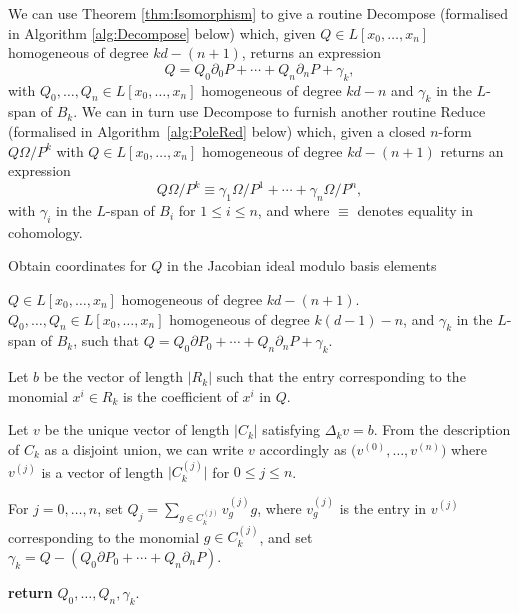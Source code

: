 \documentclass[a4paper,11pt]{article}
\numberwithin{equation}{section}
\providecommand{\abs}[1]{\lvert#1\rvert}                 %
\theoremstyle{definition}
\begin{document}
We can use Theorem \ref{thm:Isomorphism} to give a routine {\sc Decompose} (formalised in
Algorithm \ref{alg:Decompose} below) which, 
given $Q \in L[x_0, \dotsc, x_n]$ homogeneous of degree $kd - (n+1)$, 
returns an expression 
\begin{equation}
Q = Q_0 \partial_0 P + \dotsb + Q_n \partial_n P + \gamma_k,
\end{equation} 
with $Q_0, \dotsc, Q_n \in L[x_0, \dotsc, x_n]$ homogeneous of degree $kd-n$ and 
$\gamma_k$ in the $L$-span of $B_k$. We can in turn use {\sc Decompose}
to furnish another routine {\sc Reduce} (formalised in Algorithm~\ref{alg:PoleRed} below) 
which, given a closed $n$-form $Q\Omega/P^k$ with $Q \in L[x_0, \dotsc, x_n]$ homogeneous 
of degree $kd - (n+1)$ returns an expression
\begin{equation}
Q \Omega / P^k \equiv \gamma_{1} \Omega / P^{1} + \dotsb + \gamma_n \Omega / P^n,
\end{equation}
with $\gamma_i$ in the $L$-span of $B_i$ for $1 \leq i \leq n$, and where $\equiv$ denotes 
equality in cohomology.

\begin{algorithm}[ht]
\caption{Obtain coordinates for $Q$ in the Jacobian ideal modulo basis elements}
\label{alg:Decompose}
\begin{algorithmic}
\Require $Q \in L[x_0, \dotsc, x_n]$ homogeneous of degree $kd - (n+1)$.
\Ensure  $Q_0, \dotsc, Q_n \in L[x_0, \dotsc, x_n]$ homogeneous of degree 
         $k(d-1)-n$, and $\gamma_k$ in the $L$-span of $B_k$, such that 
         $Q = Q_0 \partial P_0 + \dotsb + Q_n \partial_n P +\gamma_k$.
\State \begin{compactenum}[\it {Step} I.] \vspace{-1.24em}
\item Let $b$ be the vector of length $\abs{R_k}$ such that the entry 
      corresponding to the monomial $x^i \in R_k$ is the coefficient of 
      $x^i$ in $Q$.
\item Let $v$ be the unique vector of length $\abs{C_k}$ satisfying 
      $\Delta_k v = b$.  From the description of $C_k$ as a disjoint union, 
      we can write $v$ accordingly as $\bigl(v^{(0)}, \dotsc, v^{(n)}\bigr)$ 
      where $v^{(j)}$ is a vector of length 
      $\abs{C_k^{(j)}}$ for $0 \leq j \leq n$.
\item For $j = 0, \dotsc, n$, set $Q_j = \sum_{g \in C_k^{(j)}} v_g^{(j)} g$,
      where $v_g^{(j)}$ is the entry in $v^{(j)}$ corresponding to the 
      monomial $g \in C_k^{(j)}$, and set $\gamma_k = Q-(Q_0 \partial P_0 + \dotsb + Q_n \partial_n P)$.
\item \textbf{return} $Q_0, \dotsc, Q_n,\gamma_k$.
\end{compactenum}
\EndProcedure
\end{algorithmic}
\end{algorithm}
\end{document}
